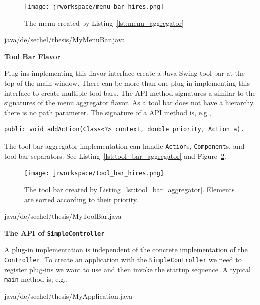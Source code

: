 \documentclass[Thesis.tex]{subfiles}
\begin{document}
\begin{figure}[H]
\centering
\texttt{[image: jrworkspace/menu\_bar\_hires.png]}
\caption{The menu created by Listing~\ref{lst:menu_aggregator}}
\label{fig:menu_aggregator}
\end{figure}

 {java/de/sechel/thesis/MyMenuBar.java}

{\bf Tool Bar Flavor}

Plug-ins implementing this flavor interface create a {\sc Java Swing\TReg} tool bar at the top of the 
main window. There can be more than one plug-in implementing this interface to create multiple 
tool bars. The API method signatures a similar to the signatures of the menu aggregator flavor. As 
a tool bar does not have a hierarchy, there is no path parameter. The signature of a API method is, e.g.,

\begin{lstlisting}[numbers=none]
	public void addAction(Class<?> context, double priority, Action a).
\end{lstlisting}

The tool bar aggregator implementation can handle {\tt Action}s, {\tt Component}s, and tool bar
separators. See Listing~\ref{lst:tool_bar_aggregator} and Figure~\ref{fig:tool_bar_aggregator}.

\begin{figure}[H]
\centering
\texttt{[image: jrworkspace/tool\_bar\_hires.png]}
\caption{The tool bar created by Listing~\ref{lst:tool_bar_aggregator}. Elements are sorted according to their
priority.}
\label{fig:tool_bar_aggregator}
\end{figure}

 {java/de/sechel/thesis/MyToolBar.java}

{\bf The API of {\tt SimpleController}}

A plug-in implementation is independent of the concrete implementation of the {\tt Controller}. To create an
application with the {\tt SimpleController} we need to register plug-ins we want to use and then invoke the
startup sequence. A typical {\tt main} method is, e.g.,

 {java/de/sechel/thesis/MyApplication.java}
\end{document}
